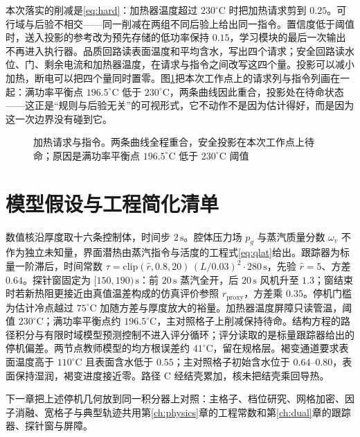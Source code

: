本次落实的削减是\eqref{eq:hard}：加热器温度超过 \(230^\circ\mathrm{C}\) 时把加热请求剪到 \(0.25\)。可行域与后验不相交——同一削减在两组不同后验上给出同一指令。置信度低于阈值时，送入投影的参考改为预先存储的低功率保持 \(0.15\)，学习模块的最后一次输出不再进入执行器。品质回路读表面温度和平均含水，写出四个请求；安全回路读水位、门、剩余电流和加热器温度，在请求与指令之间改写这四个量。投影可以减小加热，断电可以把四个量同时置零。图\ref{fig:d19proj}{}把本次工作点上的请求列与指令列画在一起：满功率平衡点 \(196.5^\circ\mathrm{C}\) 低于 \(230^\circ\mathrm{C}\)，两条曲线因此重合，投影处在待命状态——这正是“规则与后验无关”的可视形式，它不动作不是因为估计得好，而是因为这一次边界没有碰到它。

\begin{figure}[htbp]
\centering
{}
\caption{加热请求与指令。两条曲线全程重合，安全投影在本次工作点上待命；原因是满功率平衡点 $196.5^\circ\mathrm{C}$ 低于 $230^\circ\mathrm{C}$ 阈值}
\label{fig:d19proj}
\end{figure}

\section{模型假设与工程简化清单}

数值核沿厚度取十六条控制体，时间步 \(2\,\mathrm{s}\)。腔体压力场 \(p_g\) 与蒸汽质量分数 \(\omega_v\) 不作为独立未知量，界面潜热由蒸汽指令与活度的工程式\eqref{eq:qlat}给出。跟踪器为标量一阶滞后，时间常数 \(\tau=\mathrm{clip}(\hat r,0.8,20)\,(L/0.03)^2\cdot 280\,\mathrm{s}\)，先验 \(\hat r=5\)、方差 \(0.64\)。探针窗固定为 \([150,190)\,\mathrm{s}\)：前 \(20\,\mathrm{s}\) 蒸汽全开，后 \(20\,\mathrm{s}\) 风机升至 \(1.3\)；窗结束时若新热阻更接近由真值温差构成的仿真评价参照 \(r_{\mathrm{proxy}}\)，方差乘 \(0.35\)。停机门槛为估计冷点越过 \(75^\circ\mathrm{C}\) 加随方差与厚度放大的裕量。加热器温度屏障只读管温，阈值 \(230^\circ\mathrm{C}\)；满功率平衡点约 \(196.5^\circ\mathrm{C}\)，主对照格子上削减保持待命。结构方程的路径积分与有限时域模型预测控制不进入评分循环；评分读取的是标量跟踪器给出的停机偏差。两节点教师模型的均方根误差约 \(41^\circ\mathrm{C}\)，留在规格层。褐变通道要求表面温度高于 \(110^\circ\mathrm{C}\) 且表面含水低于 \(0.55\)；主对照格子初始含水位于 \(0.64\)--\(0.80\)，表面保持湿润，褐变进度接近零。路径 C 经结壳累加，核未把结壳乘回导热。

下一章把上述停机几何放到同一积分器上对照：主格子、档位研究、网格加密、因子消融、宽格子与典型轨迹共用第\ref{ch:physics}{}章的工程常数和第\ref{ch:dual}{}章的跟踪器、探针窗与屏障。
\FloatBarrier
